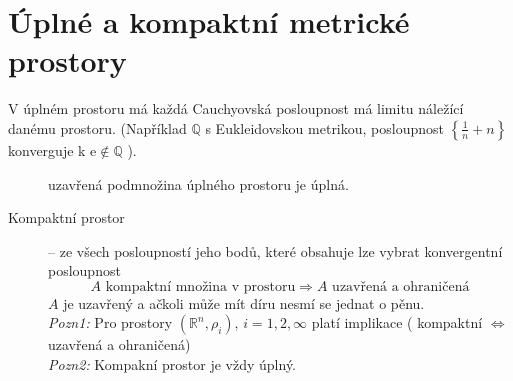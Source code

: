 \documentclass[a4paper, twoside,%
12pt]{article}
\newcommand{\R}{\mathbb{R}}
\newcommand{\e}{\mathrm{e}}
\newcommand{\Q}{\mathbb{Q}}
\begin{document}
\section{Úplné a kompaktní metrické prostory}
V úplném prostoru má každá Cauchyovská posloupnost má limitu náležící danému prostoru. ({Například} $\Q$ s Eukleidovskou metrikou, posloupnost $\left\lbrace\frac{1}{n}+n\right\rbrace$ konverguje k $\e \notin \Q$ ).
\begin{description}
        \item[] uzavřená podmnožina úplného prostoru je úplná.
        \item[Kompaktní prostor] -- ze všech posloupností jeho bodů, které obsahuje lze vybrat konvergentní posloupnost
        $$ A \text{ kompaktní množina v prostoru} \Rightarrow A \text{ uzavřená a ohraničená} $$
        $A$ je uzavřený a ačkoli může mít díru nesmí se jednat o pěnu.\\
        \emph{Pozn1:} Pro prostory $(\R^n, \rho_i),\, i = 1,2, \infty$ platí implikace ( kompaktní $\Leftrightarrow$ uzavřená a ohraničená)\\
        \emph{Pozn2:} Kompakní prostor je vždy úplný.
\end{description}
\end{document}

